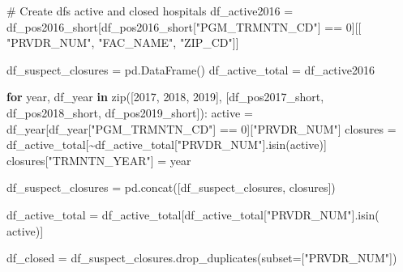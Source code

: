 \documentclass[
  letterpaper,
  DIV=11,
  numbers=noendperiod]{scrartcl}
\newenvironment{Shaded}{\begin{snugshade}}{\end{snugshade}}
\newcommand{\BuiltInTok}[1]{\textcolor[rgb]{0.00,0.23,0.31}{#1}}
\newcommand{\CommentTok}[1]{\textcolor[rgb]{0.37,0.37,0.37}{#1}}
\newcommand{\ControlFlowTok}[1]{\textcolor[rgb]{0.00,0.23,0.31}{\textbf{#1}}}
\newcommand{\DecValTok}[1]{\textcolor[rgb]{0.68,0.00,0.00}{#1}}
\newcommand{\KeywordTok}[1]{\textcolor[rgb]{0.00,0.23,0.31}{\textbf{#1}}}
\newcommand{\NormalTok}[1]{\textcolor[rgb]{0.00,0.23,0.31}{#1}}
\newcommand{\OperatorTok}[1]{\textcolor[rgb]{0.37,0.37,0.37}{#1}}
\newcommand{\StringTok}[1]{\textcolor[rgb]{0.13,0.47,0.30}{#1}}
\begin{document}
\begin{Shaded}
\begin{Highlighting}[]
\CommentTok{\# Create dfs active and closed hospitals}
\NormalTok{df\_active2016 }\OperatorTok{=}\NormalTok{ df\_pos2016\_short[df\_pos2016\_short[}\StringTok{"PGM\_TRMNTN\_CD"}\NormalTok{] }\OperatorTok{==} \DecValTok{0}\NormalTok{][[}
    \StringTok{"PRVDR\_NUM"}\NormalTok{, }\StringTok{"FAC\_NAME"}\NormalTok{, }\StringTok{"ZIP\_CD"}\NormalTok{]]}

\NormalTok{df\_suspect\_closures }\OperatorTok{=}\NormalTok{ pd.DataFrame()}
\NormalTok{df\_active\_total }\OperatorTok{=}\NormalTok{ df\_active2016}

\ControlFlowTok{for}\NormalTok{ year, df\_year }\KeywordTok{in} \BuiltInTok{zip}\NormalTok{([}\DecValTok{2017}\NormalTok{, }\DecValTok{2018}\NormalTok{, }\DecValTok{2019}\NormalTok{], [df\_pos2017\_short, df\_pos2018\_short, df\_pos2019\_short]):}
\NormalTok{    active }\OperatorTok{=}\NormalTok{ df\_year[df\_year[}\StringTok{"PGM\_TRMNTN\_CD"}\NormalTok{] }\OperatorTok{==} \DecValTok{0}\NormalTok{][}\StringTok{"PRVDR\_NUM"}\NormalTok{]}
\NormalTok{    closures }\OperatorTok{=}\NormalTok{ df\_active\_total[}\OperatorTok{\textasciitilde{}}\NormalTok{df\_active\_total[}\StringTok{"PRVDR\_NUM"}\NormalTok{].isin(active)]}
\NormalTok{    closures[}\StringTok{"TRMNTN\_YEAR"}\NormalTok{] }\OperatorTok{=}\NormalTok{ year}

\NormalTok{    df\_suspect\_closures }\OperatorTok{=}\NormalTok{ pd.concat([df\_suspect\_closures, closures])}

\NormalTok{    df\_active\_total }\OperatorTok{=}\NormalTok{ df\_active\_total[df\_active\_total[}\StringTok{"PRVDR\_NUM"}\NormalTok{].isin(}
\NormalTok{        active)]}

\NormalTok{df\_closed }\OperatorTok{=}\NormalTok{ df\_suspect\_closures.drop\_duplicates(subset}\OperatorTok{=}\NormalTok{[}\StringTok{"PRVDR\_NUM"}\NormalTok{])}
\end{Highlighting}
\end{Shaded}
\end{document}
